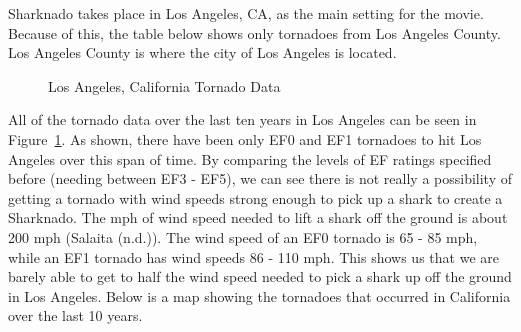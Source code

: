 \documentclass[
  letterpaper,
  DIV=11,
  numbers=noendperiod]{scrreprt}
\begin{document}
Sharknado takes place in Los Angeles, CA, as the main setting for the
movie. Because of this, the table below shows only tornadoes from Los
Angeles County. Los Angeles County is where the city of Los Angeles is
located.

\begin{figure}


\caption{\label{fig-table6}Los Angeles, California Tornado Data}

\end{figure}%

All of the tornado data over the last ten years in Los Angeles can be
seen in Figure~\ref{fig-table6}. As shown, there have been only EF0 and
EF1 tornadoes to hit Los Angeles over this span of time. By comparing
the levels of EF ratings specified before (needing between EF3 - EF5),
we can see there is not really a possibility of getting a tornado with
wind speeds strong enough to pick up a shark to create a Sharknado. The
mph of wind speed needed to lift a shark off the ground is about 200 mph
(Salaita (n.d.)). The wind speed of an EF0 tornado is 65 - 85 mph, while
an EF1 tornado has wind speeds 86 - 110 mph. This shows us that we are
barely able to get to half the wind speed needed to pick a shark up off
the ground in Los Angeles. Below is a map showing the tornadoes that
occurred in California over the last 10 years.
\end{document}
